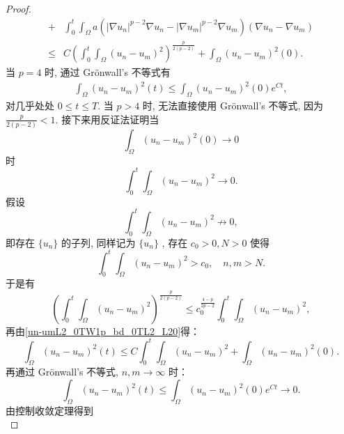 \documentclass[twoside,longtitle]{LZUthesis}
\theoremstyle{definition}
\numberwithin{equation}{chapter}
\newcommand*\abs[1]{\lvert#1\rvert}
\newcommand*\Brace[1]{\lbrace#1\rbrace}
\begin{document}
\begin{proof}
\begin{equation}
\begin{split}
			+{} & \int_{0}^{t}\int_{\Omega}a
			\left(\abs{\nabla u_n}^{p-2}\nabla u_n
			- \abs{\nabla u_m}^{p-2}\nabla u_m\right)
			\left(\nabla u_n - \nabla u_m\right)\\
			\leq{} & C\left(\int_0^t\int_{\Omega}
			\left(u_n-u_m\right)^2\right)^{\frac{p}{2(p-2)}}
			+ \int_{\Omega}\left(u_n-u_m\right)^2(0).
		\end{split}
	\end{equation}
	当 $p=4$ 时, 通过 Gr\"onwall's 不等式有
	\begin{equation}
		\begin{split}
			\int_{\Omega}\left( u_n-u_m \right)^2(t)
			\leq \int_{\Omega}\left(u_n-u_m\right)^2(0)e^{Ct} ,
		\end{split}
	\end{equation}
	对几乎处处 $0 \leq t \leq T$. 当 $p>4$ 时,
	无法直接使用 Gr\"onwall's 不等式,
	因为 $\frac{p}{2(p-2)}<1$. 接下来用反证法证明当
	\begin{equation}
		\int_{\Omega}\left(u_n-u_m\right)^2(0) \to 0
	\end{equation}
	时
	\begin{equation}
		\int_0^t\int_{\Omega}\left(u_n-u_m\right)^2 \to 0.
	\end{equation}
	假设
	\begin{equation*}
		\int_0^t\int_{\Omega}\left(u_n-u_m\right)^2 \not\to 0,
	\end{equation*}
	即存在 $\Brace{u_n}$ 的子列, 同样记为 $\Brace{u_n}$ , 存在 $c_0 > 0, N > 0$ 使得
	\begin{equation*}
		\int_0^t\int_{\Omega}\left(u_n-u_m\right)^2 > c_0, \quad n, m > N.
	\end{equation*}
	于是有
	\begin{equation*}
		\left(\int_0^t\int_{\Omega}\left(u_n-u_m\right)^2\right)^{\frac{p}{2(p-2)}}
		\leq c_0^{\frac{4-p}{2p-2}}\int_0^t\int_{\Omega}\left(u_n-u_m\right)^2,
	\end{equation*}
	再由\cref{un-umL2_0TW1p_bd_0TL2_L20}得：
	\begin{equation}
		\int_{\Omega}\left(u_n-u_m\right)^2(t)
		\leq C\int_0^t\int_{\Omega}\left(u_n-u_m\right)^2
		+ \int_{\Omega}\left(u_n-u_m\right)^2(0).
	\end{equation}
	再通过 Gr\"onwall's 不等式, $n, m \to \infty$ 时：
	\begin{equation}
		\int_{\Omega}\left( u_n-u_m \right)^2(t)
		\leq \int_{\Omega}\left(u_n-u_m\right)^2(0)e^{Ct} \to 0.
	\end{equation}
	由控制收敛定理得到
	\begin{equation}

\end{equation}
\end{proof}
\end{document}

